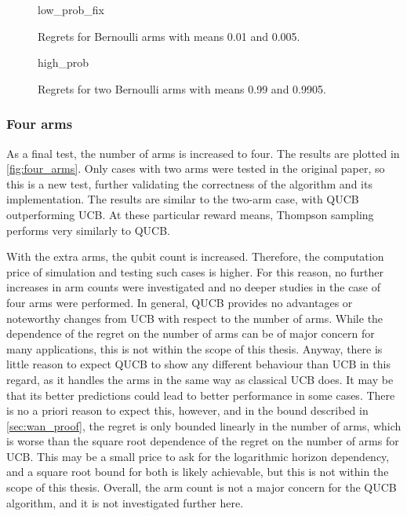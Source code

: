 \vfill
\pagebreak

\begin{figure}[p]
    \centering
    \newcommand{\myoptions}{
        width=10cm,
        height=8cm,
        xlabel={Kiloturn},
        ylabel={Regret},
        legend entries={Baseline, UCB, QUCB, Thompson},
        legend pos=north west,
        legend cell align=left,
        mystyle,
    }
    {low_prob_fix}
    \caption{Regrets for Bernoulli arms with means 0.01 and 0.005.}
    \label{fig:low_prob_fix}
\end{figure}

\begin{figure}[p]
    \centering
    \newcommand{\myoptions}{
        width=10cm,
        height=8cm,
        xlabel={Kiloturn},
        ylabel={Regret},
        legend entries={Baseline, UCB, QUCB, Thompson},
        legend pos=north west,
        legend cell align=left,
        mystyle,
    }
    {high_prob}
    \caption{Regrets for two Bernoulli arms with means 0.99 and 0.9905.}
    \label{fig:high_prob}
\end{figure}


\clearpage

\vspace*{2cm plus 1cm minus 1cm}
\subsubsection{Four arms}
As a final test, the number of arms is increased to four.
The results are plotted in \cref{fig:four_arms}.
Only cases with two arms were tested in the original paper, so this is a new test, further validating the correctness of the algorithm and its implementation.
The results are similar to the two-arm case, with QUCB outperforming UCB.
At these particular reward means, Thompson sampling performs very similarly to QUCB.


With the extra arms, the qubit count is increased.
Therefore, the computation price of simulation and testing such cases is higher.
For this reason, no further increases in arm counts were investigated and no deeper studies in the case of four arms were performed.
In general, QUCB provides no advantages or noteworthy changes from UCB with respect to the number of arms.
While the dependence of the regret on the number of arms can be of major concern for many applications, this is not within the scope of this thesis.
Anyway, there is little reason to expect QUCB to show any different behaviour than UCB in this regard, as it handles the arms in the same way as classical UCB does.
It may be that its better predictions could lead to better performance in some cases.
There is no a priori reason to expect this, however, and in the bound described in \cref{sec:wan_proof}, the regret is only bounded linearly in the number of arms, which is worse than the square root dependence of the regret on the number of arms for UCB.
This may be a small price to ask for the logarithmic horizon dependency, and a square root bound for both is likely achievable, but this is not within the scope of this thesis.
Overall, the arm count is not a major concern for the QUCB algorithm, and it is not investigated further here.

